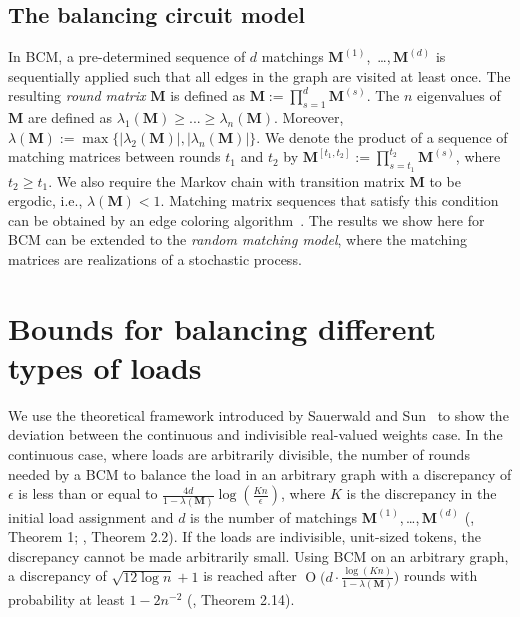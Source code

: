 \documentclass[12pt,psfig,a4]{article}
\newcommand{\BigO}[1]{\ensuremath{\operatorname{O}\bigl(#1\bigr)}}
\theoremstyle{plain}
\begin{document}
\subsection{The balancing circuit model}
In BCM, a pre-determined sequence of $d$ matchings $\mathbf{M}^{(1)}$,\, \ldots,\,$\mathbf{M}^{(d)}$ is sequentially applied such that all edges in the graph are visited at least once. The resulting \textit{round matrix} $\mathbf{M}$ \cite{rabani1998local} is defined as $\mathbf{M}:= \prod_{s=1}^d \mathbf{M}^{(s)}$. The $n$ eigenvalues of $\mathbf{M}$ are defined as $\lambda_1(\mathbf{M})\geq ... \geq \lambda_n(\mathbf{M})$. Moreover, $\lambda (\mathbf{M}):=\max\{|\lambda_2(\mathbf{M})|,|\lambda_n(\mathbf{M})|\}$. 
We denote the product of a sequence of matching matrices between rounds $t_1$ and $t_2$ by $\mathbf{M}^{[t_1,t_2]}:=\prod_{s=t_1}^{t_2}\mathbf{M}^{(s)}$, where $t_2\geq t_1$. We also require the Markov chain with transition matrix $\mathbf{M}$ to be ergodic, i.e., $\lambda(\mathbf{M})<1$. 
Matching matrix sequences that satisfy this condition can be obtained by an edge coloring algorithm~\cite{brelaz1979new,panconesi1997randomized}. 
The results we show here for BCM can be extended to the \textit{random matching model}, where the matching matrices are realizations of a stochastic process. 


\section{Bounds for balancing different types of loads}
\label{sec:bcm}
We use the theoretical framework introduced by Sauerwald and Sun~\cite{sauerwald2012tight} to show the deviation between the continuous and indivisible real-valued weights case. In the continuous case, where loads are arbitrarily divisible, the number of rounds needed by a BCM to balance the load in an arbitrary graph with a discrepancy of $\epsilon$ is less than or equal to $\frac{4 d}{1-\lambda(\mathbf{M})} \log \left ( \frac{Kn}{\epsilon} \right)$, where $K$ is the discrepancy in the initial load assignment and $d$ is the number of matchings $\mathbf{M}^{(1)}$,\,\ldots ,\,$\mathbf{M}^{(d)}$ (\cite{rabani1998local}, Theorem 1; \cite{sauerwald2012tight}, Theorem 2.2).
If the loads are indivisible, unit-sized tokens, the discrepancy cannot be made arbitrarily small. Using BCM on an arbitrary graph, a discrepancy of $\sqrt{12\log{n}}+1$ is reached after $\BigO{d \cdot \frac{\log{(Kn)}}{1-\lambda(\mathbf{M})}}$ rounds with probability at least $1-2n^{-2}$ (\cite{sauerwald2012tight}, Theorem 2.14).
\end{document}

